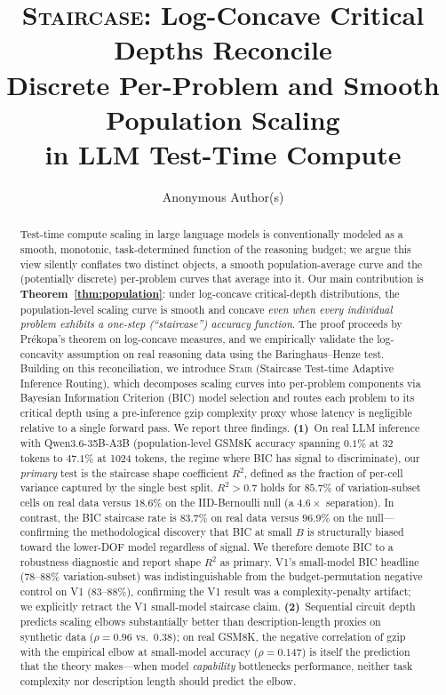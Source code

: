 \documentclass{article}
\title{\textsc{Staircase}: Log-Concave Critical Depths Reconcile\\Discrete Per-Problem and Smooth Population Scaling\\in LLM Test-Time Compute}
\author{Anonymous Author(s)}
\newcommand{\method}{\textsc{Stair}}
\begin{document}
\maketitle

\begin{abstract}
Test-time compute scaling in large language models is conventionally modeled as a smooth, monotonic, task-determined function of the reasoning budget; we argue this view silently conflates two distinct objects, a smooth population-average curve and the (potentially discrete) per-problem curves that average into it.  Our main contribution is \textbf{Theorem~\ref{thm:population}}: under log-concave critical-depth distributions, the population-level scaling curve is smooth and concave \emph{even when every individual problem exhibits a one-step (``staircase'') accuracy function}.  The proof proceeds by Pr\'{e}kopa's theorem on log-concave measures, and we empirically validate the log-concavity assumption on real reasoning data using the Baringhaus--Henze test.  Building on this reconciliation, we introduce \method{} (Staircase Test-time Adaptive Inference Routing), which decomposes scaling curves into per-problem components via Bayesian Information Criterion (BIC) model selection and routes each problem to its critical depth using a pre-inference gzip complexity proxy whose latency is negligible relative to a single forward pass.  We report three findings.
\textbf{(1)}~On real LLM inference with Qwen3.6-35B-A3B (population-level GSM8K accuracy spanning $0.1\%$ at 32 tokens to $47.1\%$ at 1024 tokens, the regime where BIC has signal to discriminate), our \emph{primary} test is the staircase shape coefficient $R^2$, defined as the fraction of per-cell variance captured by the single best split.  $R^2 > 0.7$ holds for $\bm{85.7\%}$ of variation-subset cells on real data versus $\bm{18.6\%}$ on the IID-Bernoulli null (a $4.6\times$ separation).  In contrast, the BIC staircase rate is $83.7\%$ on real data versus $96.9\%$ on the null---confirming the methodological discovery that BIC at small $B$ is structurally biased toward the lower-DOF model regardless of signal.  We therefore demote BIC to a robustness diagnostic and report shape $R^2$ as primary.  V1's small-model BIC headline (78--88\% variation-subset) was indistinguishable from the budget-permutation negative control on V1 (83--88\%), confirming the V1 result was a complexity-penalty artifact; we explicitly retract the V1 small-model staircase claim.
\textbf{(2)}~Sequential circuit depth predicts scaling elbows substantially better than description-length proxies on synthetic data ($\rho{=}0.96$ vs.\ $0.38$); on real GSM8K, the negative correlation of gzip with the empirical elbow at small-model accuracy ($\rho{=}0.147$) is itself the prediction that the theory makes---when model \emph{capability} bottlenecks performance, neither task complexity nor description length should predict the elbow.

\end{abstract}
\end{document}
